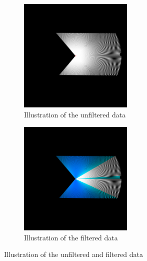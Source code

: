 \documentclass[../Head/Main.tex]{subfiles}
\begin{document}
\begin{figure}[H]
  \begin{subfigure}[b]{0.49\textwidth}
    \centering
    \includegraphics[width=0.6\textwidth]{Lidar/Lidar_visualise_unsorted_points}
    \caption{Illustration of the unfiltered data}
    \label{fig:white_lines}
  \end{subfigure}
  \hfill
  \begin{subfigure}[b]{0.49\textwidth}
  	\centering
    \includegraphics[width=0.6\textwidth]{Lidar/Lidar_visualise_sorted_points}
    \caption{Illustration of the filtered data}
    \label{fig:blue_lines}
  \end{subfigure}
  \caption{Illustration of the unfiltered and filtered data}
  \vspace{-15pt}
\end{figure}
\end{document}
